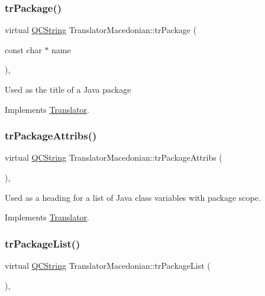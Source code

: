 \subsubsection{\texorpdfstring{trPackage()}{trPackage()}}
{\footnotesize\ttfamily virtual \mbox{\hyperlink{class_q_c_string}{Q\+C\+String}} Translator\+Macedonian\+::tr\+Package (\begin{DoxyParamCaption}\item[{const char $\ast$}]{name }\end{DoxyParamCaption})\hspace{0.3cm}{\ttfamily [inline]}, {\ttfamily [virtual]}}

Used as the title of a Java package 

Implements \mbox{\hyperlink{class_translator}{Translator}}.

\mbox{\label{class_translator_macedonian_ae63218eb2613db6fb7be7eacb657fd51}} 
\subsubsection{\texorpdfstring{trPackageAttribs()}{trPackageAttribs()}}
{\footnotesize\ttfamily virtual \mbox{\hyperlink{class_q_c_string}{Q\+C\+String}} Translator\+Macedonian\+::tr\+Package\+Attribs (\begin{DoxyParamCaption}{ }\end{DoxyParamCaption})\hspace{0.3cm}{\ttfamily [inline]}, {\ttfamily [virtual]}}

Used as a heading for a list of Java class variables with package scope. 

Implements \mbox{\hyperlink{class_translator}{Translator}}.

\mbox{\label{class_translator_macedonian_aba67a9aee59ba77e41c18ba691d1c2f4}} 
\subsubsection{\texorpdfstring{trPackageList()}{trPackageList()}}
{\footnotesize\ttfamily virtual \mbox{\hyperlink{class_q_c_string}{Q\+C\+String}} Translator\+Macedonian\+::tr\+Package\+List (\begin{DoxyParamCaption}{ }\end{DoxyParamCaption})\hspace{0.3cm}{\ttfamily [inline]}, {\ttfamily [virtual]}}

